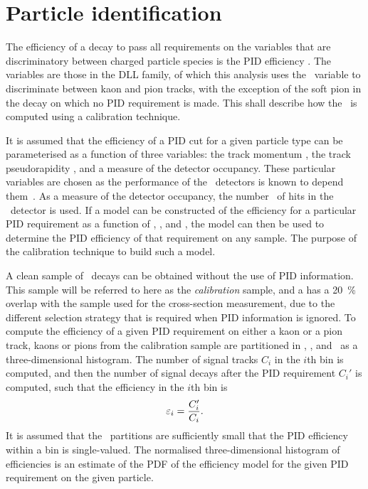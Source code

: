 \section{Particle identification}
\label{chap:prod:effs:pid}

The efficiency of a decay to pass all requirements on the variables that are 
discriminatory between charged particle species is the \ac{PID} efficiency 
\effpid.
The variables are those in the \acf{DLL} family, of which this analysis uses 
the \dllkpi\ variable to discriminate between kaon and pion tracks, with the 
exception of the soft pion in the \DstToDzpi decay on which no \ac{PID} 
requirement is made.
This  shall describe how the \effpid\ is computed 
using a calibration technique.

It is assumed that the efficiency of a \ac{PID} cut for a given particle type 
can be parameterised as a function of three variables: the track momentum 
\ptot, the track pseudorapidity \Eta, and a measure of the detector occupancy.
These particular variables are chosen as the performance of the \rich\ 
detectors is known to depend them~\cite{Adinolfi:2012qfa}.
As a measure of the detector occupancy, the number \nspd\ of hits in the \spd\ 
detector is used.
If a model can be constructed of the efficiency for a particular \ac{PID} 
requirement as a function of \ptot, \Eta, and \nspd, the model can then be used 
to determine the \ac{PID} efficiency of that requirement on any sample.
The purpose of the calibration technique to build such a model.

A clean sample of \DzToKpi\ decays can be obtained without the use of \ac{PID} 
information.
This sample will be referred to here as the \emph{calibration} sample, and a 
has a \SI{20}{\percent} overlap with the sample used for the cross-section 
measurement, due to the different selection strategy that is required when 
\ac{PID} information is ignored.
To compute the efficiency of a given \ac{PID} requirement on either a kaon or a 
pion track, kaons or pions from the calibration sample are partitioned in 
\ptot, \Eta, and \nspd\ as a three-dimensional histogram.
The number of signal tracks $C_{i}$ in the $i$th bin is computed, and then the 
number of signal decays after the \ac{PID} requirement $C_{i}'$ is computed, 
such that the efficiency in the $i$th bin is
\begin{equation}
  \varepsilon_{i} = \frac{C_{i}'}{C_{i}}.
\end{equation}
It is assumed that the \ptotetanspd\ partitions are sufficiently small that the 
\ac{PID} efficiency within a bin is single-valued.
The normalised three-dimensional histogram of efficiencies is an estimate of 
the \ac{PDF} of the efficiency model for the given \ac{PID} requirement on the 
given particle.

